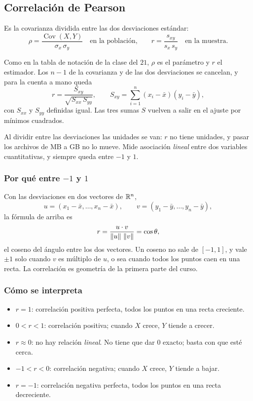 \documentclass[11pt,letterpaper]{article}
\begin{document}
\subsection*{Correlación de Pearson}

\begin{definicion}
    Es la covarianza dividida entre las dos desviaciones estándar:
    \[
        \rho = \frac{\operatorname{Cov}(X, Y)}{\sigma_x\, \sigma_y}
        \quad \text{en la población,}
        \qquad
        r = \frac{s_{xy}}{s_x\, s_y}
        \quad \text{en la muestra.}
    \]
\end{definicion}

Como en la tabla de notación de la clase del $21$, $\rho$ es el
parámetro y $r$ el estimador. Los $n - 1$ de la covarianza y de las dos
desviaciones se cancelan, y para la cuenta a mano queda
\[
    r = \frac{S_{xy}}{\sqrt{S_{xx}\, S_{yy}}} ,
    \qquad
    S_{xy} = \sum_{i=1}^{n} (x_i - \bar{x})(y_i - \bar{y}) ,
\]
con $S_{xx}$ y $S_{yy}$ definidas igual. Las tres sumas $S$ vuelven a
salir en el ajuste por mínimos cuadrados.

Al dividir entre las desviaciones las unidades se van: $r$ no tiene
unidades, y pasar los archivos de MB a GB no lo mueve. Mide asociación
\emph{lineal} entre dos variables cuantitativas, y siempre queda entre
$-1$ y $1$.

\subsubsection*{Por qué entre $-1$ y $1$}

Con las desviaciones en dos vectores de $\mathbb{R}^n$,
\[
    u = (x_1 - \bar{x}, \ldots, x_n - \bar{x}) ,
    \qquad
    v = (y_1 - \bar{y}, \ldots, y_n - \bar{y}) ,
\]
la fórmula de arriba es
\[
    r = \frac{u \cdot v}{\left\lVert u \right\rVert\, \left\lVert v \right\rVert} = \cos\theta ,
\]
el coseno del ángulo entre los dos vectores. Un coseno no sale de
$[-1, 1]$, y vale $\pm 1$ solo cuando $v$ es múltiplo de $u$, o sea
cuando todos los puntos caen en una recta. La correlación es geometría
de la primera parte del curso.

\subsubsection*{Cómo se interpreta}

\begin{itemize}[itemsep=0.3em]
    \item $r = 1$: correlación positiva perfecta, todos los puntos en
          una recta creciente.
    \item $0 < r < 1$: correlación positiva; cuando $X$ crece, $Y$
          tiende a crecer.
    \item $r \approx 0$: no hay relación \emph{lineal}. No tiene que
          dar $0$ exacto; basta con que esté cerca.
    \item $-1 < r < 0$: correlación negativa; cuando $X$ crece, $Y$
          tiende a bajar.
    \item $r = -1$: correlación negativa perfecta, todos los puntos en
          una recta decreciente.
\end{itemize}
\end{document}
